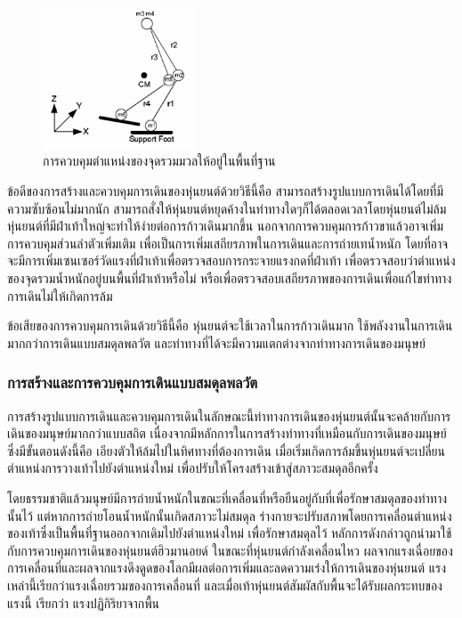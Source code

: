 \begin{figure}[htbp]
	\centering
	\includegraphics[width=0.4\textwidth]{chapter2/images/cominsupportpolygon.png}
	\caption{การควบคุมตำแหน่งของจุดรวมมวลให้อยู่ในพื้นที่ฐาน}
	\label{fig:robot_com_support}
\end{figure}

ข้อดีของการสร้างและควบคุมการเดินของหุ่นยนต์ด้วยวิธีนี้คือ สามารถสร้างรูปแบบการเดินได้โดยที่มีความซับซ้อนไม่มากนัก
สามารถสั่งให้หุ่นยนต์หยุดค้างในท่าทางใดๆก็ได้ตลอดเวลาโดยหุ่นยนต์ไม่ล้ม หุ่นยนต์ที่มีฝ่าเท้าใหญ่จะทำให้ง่ายต่อการก้าวเดินมากขึ้น
นอกจากการควบคุมการก้าวขาแล้วอาจเพิ่มการควบคุมส่วนลำตัวเพิ่มเติม เพื่อเป็นการเพิ่มเสถียรภาพในการเดินและการถ่ายเทน้ำหนัก
โดยที่อาจจะมีการเพิ่มเซนเซอร์วัดแรงที่ฝ่าเท้าเพื่อตรวจสอบการกระจายแรงกดที่ฝ่าเท้า เพื่อตรวจสอบว่าตำแหน่งของจุดรวมน้ำหนักอยู่บนพื้นที่ฝ่าเท้าหรือไม่
หรือเพื่อตรวจสอบเสถียรภาพของการเดินเพื่อแก้ไขท่าทางการเดินไม่ให้เกิดการล้ม

ข้อเสียของการควบคุมการเดินด้วยวิธีนี้คือ หุ่นยนต์จะใช้เวลาในการก้าวเดินมาก ใช้พลังงานในการเดินมากกว่าการเดินแบบสมดุลพลวัต
และท่าทางที่ได้จะมีความแตกต่างจากท่าทางการเดินของมนุษย์

\subsubsection{การสร้างและการควบคุมการเดินแบบสมดุลพลวัต}
การสร้างรูปแบบการเดินและควบคุมการเดินในลักษณะนี้ท่าทางการเดินของหุ่นยนต์นั้นจะคล้ายกับการเดินของมนุษย์มากกว่าแบบสถิต
เนื่องจากมีหลักการในการสร้างท่าทางที่เหมือนกับการเดินของมนุษย์ซึ่งมีขั้นตอนดังนี้คือ เอียงตัวให้ล้มไปในทิศทางที่ต้องการเดิน
เมื่อเริ่มเกิดการล้มขึ้นหุ่นยนต์จะเปลี่ยนตำแหน่งการวางเท้าไปยังตำแหน่งใหม่ เพื่อปรับให้โครงสร้างเข้าสู่สภาวะสมดุลอีกครั้ง

โดยธรรมชาติแล้วมนุษย์มีการถ่ายน้ำหนักในขณะที่เคลื่อนที่หรือยืนอยู่กับที่เพื่อรักษาสมดุลของท่าทางนั้นไว้
แต่หากการถ่ายโอนน้ำหนักนั้นเกิดสภาวะไม่สมดุล ร่างกายจะปรับสภาพโดยการเคลื่อนตำแหน่งของเท้าซึ่งเป็นพื้นที่ฐานออกจากเดิมไปยังตำแหน่งใหม่
เพื่อรักษาสมดุลไว้ หลักการดังกล่าวถูกนำมาใช้กับการควบคุมการเดินของหุ่นยนต์ฮิวมานอยด์ ในขณะที่หุ่นยนต์กำลังเคลื่อนไหว
ผลจากแรงเฉื่อยของการเคลื่อนที่และผลจากแรงดึงดูดของโลกมีผลต่อการเพิ่มและลดความเร่งให้การเดินของหุ่นยนต์
แรงเหล่านี้เรียกว่าแรงเฉื่อยรวมของการเคลื่อนที่ และเมื่อเท้าหุ่นยนต์สัมผัสกับพื้นจะได้รับผลกระทบของแรงนี้ เรียกว่า
แรงปฏิกิริยาจากพื้น

